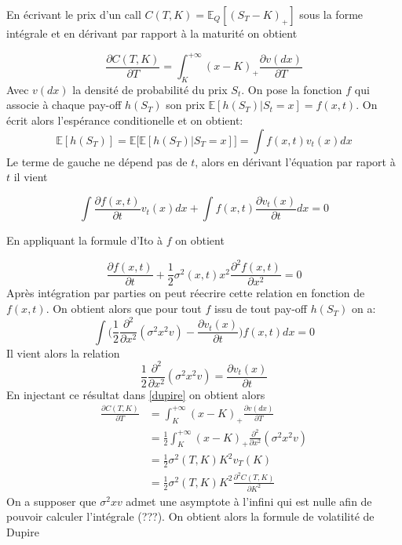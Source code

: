 \documentclass[a4paper]{article}
\begin{document}
En écrivant le prix d'un call $C(T,K) = \mathbb{E}_Q [(S_T - K)_+]$ sous la forme intégrale et en dérivant par rapport à la maturité on obtient

\begin{equation*}
    \frac{\partial C(T,K)}{\partial T} = \int_{K}^{+\infty} (x-K)_+ \frac{\partial v(dx)} {\partial T} \label{dupire}
\end{equation*}
Avec $v(dx)$ la densité de probabilité du prix $S_t$. On pose la fonction $f$ qui associe à chaque pay-off $h(S_T)$ son prix $\mathbb{E}[h(S_T)|S_t = x] = f(x, t)$. On écrit alors l'espérance conditionelle et on obtient:
\begin{equation*}
    \mathbb{E}[h(S_T)] = \mathbb{E}\bigg[\mathbb{E}[h(S_T)|S_T = x]\bigg] = \int f(x,t) v_t (x)dx 
\end{equation*}
Le terme de gauche ne dépend pas de $t$, alors en dérivant l'équation par raport à $t$ il vient

\begin{equation*}
    \int \frac{\partial f(x,t)}{\partial t} v_t (x)dx + \int f(x,t) \frac{\partial v_t (x)}{\partial t} dx = 0
\end{equation*}

En appliquant la formule d'Ito à $f$ on obtient

\begin{equation*}
    \frac{\partial f(x,t)}{\partial t} + \frac{1}{2} \sigma^2 (x,t)x^2 \frac{\partial^2 f(x,t)}{\partial x ^2} = 0
\end{equation*}
Après intégration par parties on peut réecrire cette relation en fonction de $f(x,t)$. On obtient alors que pour tout $f$ issu de tout pay-off $h(S_T)$ on a:
\begin{equation*}
    \int \bigg( \frac{1}{2} \frac{\partial^2}{\partial x^2} (\sigma^2x^2v) - \frac{\partial v_t(x)}{\partial t} \bigg) f(x,t)dx = 0
\end{equation*}
Il vient alors la relation
\begin{equation*}
    \frac{1}{2} \frac{\partial^2}{\partial x^2} (\sigma^2x^2v) = \frac{\partial v_t(x)}{\partial t}
\end{equation*}
En injectant ce résultat dans \eqref{dupire} on obtient alors
\begin{align*}
    \frac{\partial C(T, K)}{\partial T} &= \int_{K}^{+\infty} (x-K)_+ \frac{\partial v(dx)} {\partial T} \\
    &= \frac{1}{2} \int_{K}^{+\infty} (x-K)_+ \frac{\partial^2}{\partial x^2} (\sigma^2x^2v) \\
    &= \frac{1}{2} \sigma ^2 (T,K) K^2 v_T(K) \\
    &= \frac{1}{2} \sigma ^2 (T,K) K^2 \frac{\partial ^2 C(T,K)}{\partial K^2}
\end{align*}
On a supposer que $\sigma^2 x v$ admet une asymptote à l'infini qui est nulle afin de pouvoir calculer l'intégrale (???). On obtient alors la formule de volatilité de Dupire
\end{document}

